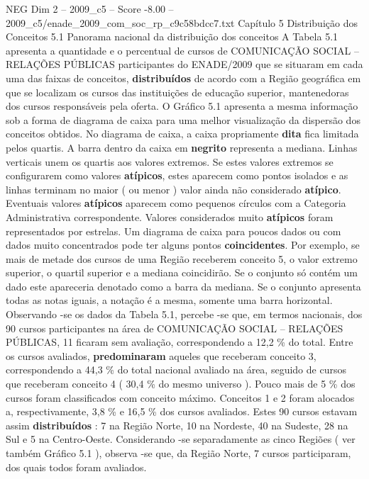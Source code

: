 \begin{textsample}{NEG Dim 2 – 2009\_c5 – Score -8.00 – 2009\_c5/enade\_2009\_com\_soc\_rp\_c9c58bdcc7.txt}  \label{ex:f2_neg_003}
Capítulo 5 Distribuição dos Conceitos 5.1 Panorama nacional da distribuição dos conceitos A Tabela 5.1 apresenta a quantidade e o percentual de cursos de COMUNICAÇÃO SOCIAL – RELAÇÕES PÚBLICAS participantes do ENADE/2009 que se situaram em cada uma das faixas de conceitos, \textbf{distribuídos} de acordo com a Região geográfica em que se localizam os cursos das instituições de educação superior, mantenedoras dos cursos responsáveis pela oferta.
O Gráfico 5.1 apresenta a mesma informação sob a forma de diagrama de caixa para uma melhor visualização da dispersão dos conceitos obtidos.
No diagrama de caixa, a caixa propriamente \textbf{dita} fica limitada pelos quartis.
A barra dentro da caixa em \textbf{negrito} representa a mediana.
Linhas verticais unem os quartis aos valores extremos.
Se estes valores extremos se configurarem como valores \textbf{atípicos}, estes aparecem como pontos isolados e as linhas terminam no maior ( ou menor ) valor ainda não considerado \textbf{atípico}.
Eventuais valores \textbf{atípicos} aparecem como pequenos círculos com a Categoria Administrativa correspondente.
Valores considerados muito \textbf{atípicos} foram representados por estrelas.
Um diagrama de caixa para poucos dados ou com dados muito concentrados pode ter alguns pontos \textbf{coincidentes}.
Por exemplo, se mais de metade dos cursos de uma Região receberem conceito 5, o valor extremo superior, o quartil superior e a mediana coincidirão.
Se o conjunto só contém um dado este apareceria denotado como a barra da mediana.
Se o conjunto apresenta todas as notas iguais, a notação é a mesma, somente uma barra horizontal.
Observando -se os dados da Tabela 5.1, percebe -se que, em termos nacionais, dos 90 cursos participantes na área de COMUNICAÇÃO SOCIAL – RELAÇÕES PÚBLICAS, 11 ficaram sem avaliação, correspondendo a 12,2 \% do total.
Entre os cursos avaliados, \textbf{predominaram} aqueles que receberam conceito 3, correspondendo a 44,3 \% do total nacional avaliado na área, seguido de cursos que receberam conceito 4 ( 30,4 \% do mesmo universo ).
Pouco mais de 5 \% dos cursos foram classificados com conceito máximo.
Conceitos 1 e 2 foram alocados a, respectivamente, 3,8 \% e 16,5 \% dos cursos avaliados.
Estes 90 cursos estavam assim \textbf{distribuídos} : 7 na Região Norte, 10 na Nordeste, 40 na Sudeste, 28 na Sul e 5 na Centro-Oeste.
Considerando -se separadamente as cinco Regiões ( ver também Gráfico 5.1 ), observa -se que, da Região Norte, 7 cursos participaram, dos quais todos foram avaliados.

\end{textsample}
